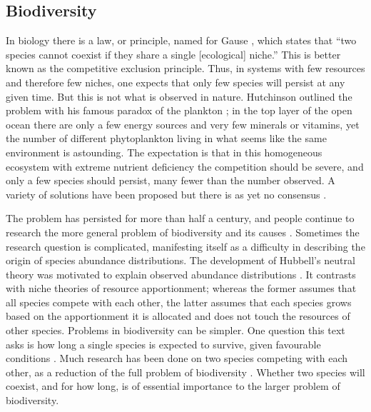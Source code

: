 \subsection{Biodiversity}
In biology there is a law, or principle, named for Gause \cite{Gause1934}, which states that ``two species cannot coexist if they share a single [ecological] niche.'' 
This is better known as the competitive exclusion principle. %
Thus, in systems with few resources and therefore few niches, one expects that only few species will persist at any given time. 
But this is not what is observed in nature. 
Hutchinson outlined the problem with his famous paradox of the plankton \cite{Hutchinson1961}; %
in the top layer of the open ocean there are only a few energy sources and very few minerals or vitamins, yet the number of different phytoplankton living in what seems like the same environment is astounding. 
The expectation is that in this homogeneous ecosystem with extreme nutrient deficiency the competition should be severe, and only a few species should persist, many fewer than the number observed. 
A variety of solutions have been proposed but there is as yet no consensus \cite{Roy2007}. 

The problem has persisted for more than half a century, and people continue to research the more general problem of biodiversity and its causes \cite{May1999,Chesson2000,Pennisi2005,Kelly2008}. 
Sometimes the research question is complicated, manifesting itself as a difficulty in describing the origin of species abundance distributions. 
The development of Hubbell's neutral theory was motivated to explain observed abundance distributions \cite{Hubbell2001}. 
It contrasts with niche theories of resource apportionment; whereas the former assumes that all species compete with each other, the latter assumes that each species grows based on the apportionment it is allocated and does not touch the resources of other species. 
Problems in biodiversity can be simpler. 
One question this text asks is how long a single species is expected to survive, given favourable conditions \cite{Badali2}. 
Much research has been done on two species competing with each other, as a reduction of the full problem of biodiversity \cite{many}. 
Whether two species will coexist, and for how long, is of essential importance to the larger problem of biodiversity. 

